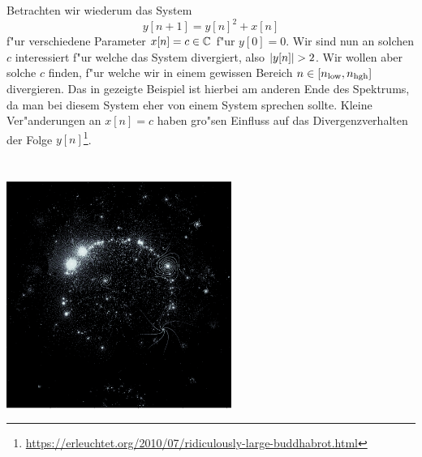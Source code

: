 Betrachten wir wiederum das System
\[
    y[n+1] = y[n]^2 + x[n]
\]
f"ur verschiedene Parameter $x[n] = c \in \mathbb{C}$ f"ur $y[0] = 0$.
Wir sind nun an solchen $c$ interessiert f"ur welche das System divergiert, also ${\left| y[n] \right|} > 2$.
Wir wollen aber solche $c$ finden, f"ur welche wir in einem gewissen Bereich $n \in [n_{\rm low}, n_{\rm hgh}]$ divergieren.
Das in  gezeigte Beispiel ist hierbei am anderen Ende des Spektrums, da man bei diesem System eher von einem  System sprechen sollte. Kleine Ver"anderungen an $x[n] = c$ haben gro"sen Einfluss auf das Divergenzverhalten der Folge $y[n]$\footnote{\url{https://erleuchtet.org/2010/07/ridiculously-large-buddhabrot.html}}.
\begin{listing}
    \noindent
    \begin{minipage}{0.49\textwidth}
        \strut\vspace*{-\baselineskip}\newline
        \inputminted[firstline=5,lastline=26]{python3}{code/buddhabrot.py}
    \end{minipage}%
    \begin{minipage}{0.49\textwidth}
        \strut\vspace*{-\baselineskip}\newline
        \inputminted[firstline=29,lastline=53]{python3}{code/buddhabrot.py}
    \end{minipage}

    \begin{center}
        \includegraphics[width=0.55\textwidth]{code/buddhabrot.png}
    \end{center}
    \label{py:buddhabrot}
\end{listing}

